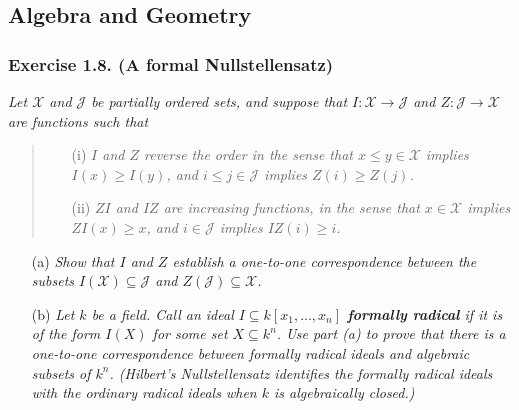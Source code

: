 \documentclass{article}
\begin{document}



\subsection*{Algebra and Geometry \\}



\subsubsection*{Exercise 1.8. (A formal Nullstellensatz)}
\emph{Let $\mathcal{X}$ and $\mathcal{J}$ be partially ordered sets,
and suppose that $I: \mathcal{X} \to \mathcal{J}$ and $Z: \mathcal{J} \to \mathcal{X}$
are functions such that}
\begin{quote}
  \begin{enumerate}
  \item[(i)]
  \emph{$I$ and $Z$ reverse the order in the sense that $x \leq y \in \mathcal{X}$
  implies $I(x) \geq I(y)$, and $i \leq j \in \mathcal{J}$ implies $Z(i) \geq Z(j)$.}
  \item[(ii)]
  \emph{$ZI$ and $IZ$ are increasing functions, in the sense that
  $x \in \mathcal{X}$ implies $ZI(x) \geq x$,
  and $i \in \mathcal{J}$ implies $IZ(i) \geq i$.}
  \end{enumerate}
\end{quote}
\begin{enumerate}
\item[(a)]
  \emph{Show that $I$ and $Z$ establish a one-to-one correspondence between
  the subsets $I(\mathcal{X}) \subseteq \mathcal{J}$ and $Z(\mathcal{J}) \subseteq \mathcal{X}$.}
\item[(b)]
  \emph{Let $k$ be a field.
  Call an ideal $I \subseteq k[x_1,\ldots,x_n]$ \textbf{formally radical}
  if it is of the form $I(X)$ for some set $X \subseteq k^n$.
  Use part (a) to prove that there is a one-to-one correspondence between
  formally radical ideals and algebraic subsets of $k^n$.
  (Hilbert's Nullstellensatz identifies the formally radical ideals
  with the ordinary radical ideals when $k$ is algebraically closed.)} \\
\end{enumerate}
\end{document}
